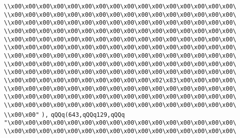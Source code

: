 \verb|\\x00\x00\x00\x00\x00\x00\x00\x00\x00\x00\x00\x00\x00\x00\x00\x00\|\newline
\verb|\\x00\x00\x00\x00\x00\x00\x00\x00\x00\x00\x00\x00\x00\x00\x00\x00\|\newline
\verb|\\x00\x00\x00\x00\x00\x00\x00\x00\x00\x00\x00\x00\x00\x00\x00\x00\|\newline
\verb|\\x00\x00\x00\x00\x00\x00\x00\x00\x00\x00\x00\x00\x00\x00\x00\x00\|\newline
\verb|\\x00\x00\x00\x00\x00\x00\x00\x00\x00\x00\x00\x00\x00\x00\x00\x00\|\newline
\verb|\\x00\x00\x00\x00\x00\x00\x00\x00\x00\x00\x00\x00\x00\x00\x00\x00\|\newline
\verb|\\x00\x00\x00\x00\x00\x00\x00\x00\x00\x00\x00\x00\x00\x00\x00\x00\|\newline
\verb|\\x00\x00\x00\x00\x00\x00\x00\x00\x00\x00\x00\x00\x00\x00\x00\x00\|\newline
\verb|\\x00\x00\x00\x00\x00\x00\x00\x00\x00\x00\x00\x00\x00\x00\x00\x00\|\newline
\verb|\\x00\x00\x00\x00\x00\x00\x00\x00\x00\x00\x02\x83\x00\x00\x00\x00\|\newline
\verb|\\x00\x00\x00\x00\x00\x00\x00\x00\x00\x00\x00\x00\x00\x00\x00\x00\|\newline
\verb|\\x00\x00\x00\x00\x00\x00\x00\x00\x00\x00\x00\x00\x00\x00\x00\x00\|\newline
\verb|\\x00\x00\x00\x00\x00\x00\x00\x00\x00\x00\x00\x00\x00\x00\x00\x00\|\newline
\verb|\\x00\x00"|\newline
\verb|),|\newline
\verb|qQQq(643,qQQq129,qQQq|\newline
\verb|"\x00\x00\x00\x00\x00\x00\x00\x00\x00\x00\x00\x00\x00\x00\x00\x00\|\newline
\verb|\\x00\x00\x00\x00\x00\x00\x00\x00\x00\x00\x00\x00\x00\x00\x00\x00\|\newline
